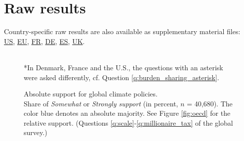 \clearpage
\section{Raw results%
}\label{app:raw_results}

Country-specific raw results are also available as supplementary material files:  \href{https://github.com/bixiou/international_attitudes_toward_global_policies/raw/main/paper/app_desc_stats_US.pdf}{US}, \href{https://github.com/bixiou/international_attitudes_toward_global_policies/raw/main/paper/app_desc_stats_EU.pdf}{EU}, \href{https://github.com/bixiou/international_attitudes_toward_global_policies/raw/main/paper/app_desc_stats_FR.pdf}{FR}, \href{https://github.com/bixiou/international_attitudes_toward_global_policies/raw/main/paper/app_desc_stats_DE.pdf}{DE}, \href{https://github.com/bixiou/international_attitudes_toward_global_policies/raw/main/paper/app_desc_stats_ES.pdf}{ES}, \href{https://github.com/bixiou/international_attitudes_toward_global_policies/raw/main/paper/app_desc_stats_UK.pdf}{UK}.

\begin{figure}[h!]
    \caption[Absolute support for global climate policies]{Absolute support for global climate policies. \\ Share of \textit{Somewhat} or \textit{Strongly support} (in percent, $n$ = 40,680). The color blue denotes an absolute majority. See Figure \ref{fig:oecd} for the relative support. (Questions \ref{q:scale}-\ref{q:millionaire_tax} of the global survey.)%
    } 
    \label{fig:oecd_absolute}%
    {\footnotesize \\ *In Denmark, France and the U.S., the questions with an asterisk were asked differently, cf. Question \ref{q:burden_sharing_asterisk}. } 
\end{figure}

